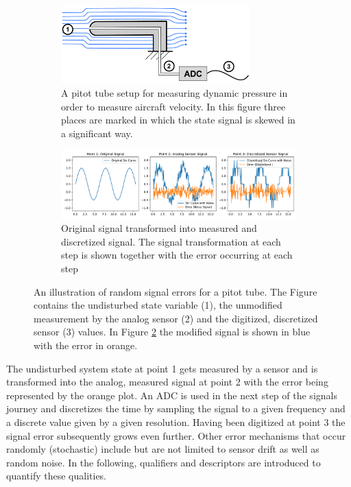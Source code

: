 \begin{figure}[!h]
    \centering
    \begin{subfigure}{\textwidth}
        \centering
        \includegraphics[width=0.8\textwidth]{03_figures/signal_recording}
        \caption[Exemplary pitot tube for visualizing sensor error]{A pitot tube setup for measuring dynamic pressure in order to measure aircraft velocity. In this figure three places are marked in which the state signal is skewed in a significant way.}
        \label{fig:signal_processing_setup}
    \end{subfigure}
    \begin{subfigure}{\textwidth}
        \centering
        \includegraphics[width=\textwidth]{03_figures/python_functions/images/signal_processing_plots}
        \caption[Pitot Tube signal visualization with inherent errors]{Original signal transformed into measured and discretized signal. The signal transformation at each step is shown together with the error occurring at each step}
        \label{fig:signal_processing_plots}
    \end{subfigure}
    \caption[Exemplary signal processign flow for a pitot tube]{An illustration of random signal errors for a pitot tube. The Figure contains the undisturbed state variable (1), the unmodified measurement by the analog sensor (2) and the digitized, discretized sensor (3) values. In Figure \ref{fig:signal_processing_plots} the modified signal is shown in blue with the error in orange.}
    \label{fig:signal_processing}
\end{figure}

The undisturbed system state at point 1 gets measured by a sensor and is transformed into the analog, measured signal at point 2 with the error being represented by the orange plot. An ADC is used in the next step of the signals journey and discretizes the time by sampling the signal to a given frequency and a discrete value given by a given resolution. Having been digitized at point 3 the signal error subsequently grows even further. Other error mechanisms that occur randomly (stochastic) include but are not limited to sensor drift as well as random noise. In the following, qualifiers and descriptors are introduced to quantify these qualities.

